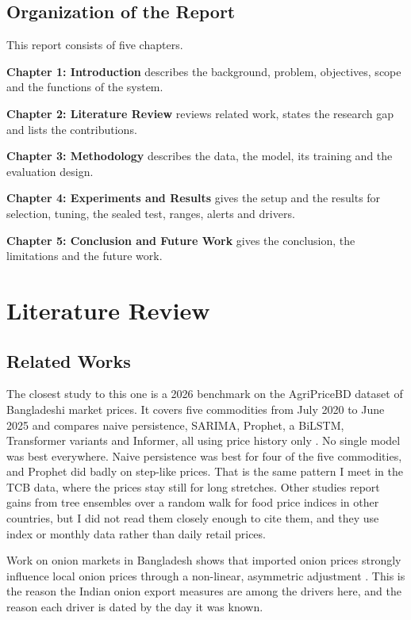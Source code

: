 \documentclass[12pt]{report}
\begin{document}
\section{Organization of the Report}
This report consists of five chapters.

\textbf{Chapter 1: Introduction} describes the background, problem, objectives, scope and the functions of the system.

\textbf{Chapter 2: Literature Review} reviews related work, states the research gap and lists the contributions.

\textbf{Chapter 3: Methodology} describes the data, the model, its training and the evaluation design.

\textbf{Chapter 4: Experiments and Results} gives the setup and the results for selection, tuning, the sealed test, ranges, alerts and drivers.

\textbf{Chapter 5: Conclusion and Future Work} gives the conclusion, the limitations and the future work.

\chapter{Literature Review}

\section{Related Works}
The closest study to this one is a 2026 benchmark on the AgriPriceBD dataset of Bangladeshi market prices. It covers five commodities from July 2020 to June 2025 and compares naive persistence, SARIMA, Prophet, a BiLSTM, Transformer variants and Informer, all using price history only \cite{agripricebd}. No single model was best everywhere. Naive persistence was best for four of the five commodities, and Prophet did badly on step-like prices. That is the same pattern I meet in the TCB data, where the prices stay still for long stretches. Other studies report gains from tree ensembles over a random walk for food price indices in other countries, but I did not read them closely enough to cite them, and they use index or monthly data rather than daily retail prices.

Work on onion markets in Bangladesh shows that imported onion prices strongly influence local onion prices through a non-linear, asymmetric adjustment \cite{onionnardl}. This is the reason the Indian onion export measures are among the drivers here, and the reason each driver is dated by the day it was known.
\end{document}
